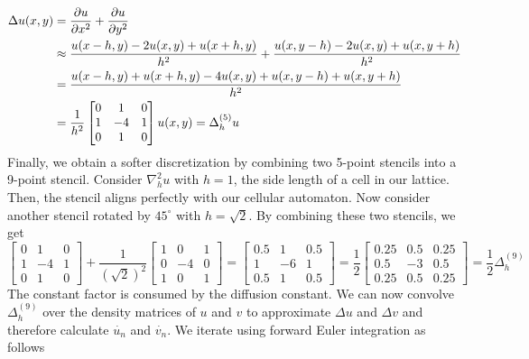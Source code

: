 \begin{align*}
  \Delta u(x, y) &= \pdv{u}{x^2} + \pdv{u}{y^2}\\
                     &\approx \frac{u(x-h, y) -2u(x, y) + u(x+h, y)}{h^2} + \frac{u(x, y-h) -2u(x, y) + u(x, y+h)}{h^2}\\
                     &= \frac{u(x-h, y)+ u(x+h, y) -4u(x, y) + u(x, y-h) + u(x, y+h)}{h^2}\\
                     &= \frac{1}{h^2} \begin{bmatrix}
                                0 & 1 & 0\\
                                1 & -4 & 1\\
                                0 & 1 & 0
                     \end{bmatrix} u(x, y) = \Delta^{(5)}_h u
\end{align*}
Finally, we obtain a softer discretization by combining two 5-point stencils into a 9-point stencil. Consider $\nabla^2_h u$ with $h = 1$, the side length of a cell in our lattice. Then, the stencil aligns perfectly with our cellular automaton. Now consider another stencil rotated by $45^\circ$ with $h=\sqrt{2}$. By combining these two stencils, we get
\[
  \begin{bmatrix}
    0 & 1 & 0\\
    1 & -4 & 1\\
    0 & 1 & 0
  \end{bmatrix}
  + \frac{1}{(\sqrt{2})^2}
  \begin{bmatrix}
    1 & 0 & 1\\
    0 & -4 & 0\\
    1 & 0 & 1
  \end{bmatrix}
  = 
  \begin{bmatrix}
    0.5 & 1 & 0.5\\
    1 & -6 & 1\\
    0.5 & 1 & 0.5
  \end{bmatrix}
  = \frac{1}{2}
  \begin{bmatrix}
    0.25 & 0.5 & 0.25\\
    0.5 & -3 & 0.5\\
    0.25 & 0.5 & 0.25
  \end{bmatrix}
  = \frac{1}{2} \Delta^{(9)}_h 
\]
The constant factor is consumed by the diffusion constant. We can now convolve $\Delta^{(9)}_h$ over the density matrices of $u$ and $v$ to approximate $\Delta u$ and $\Delta v$ and therefore calculate $\dot{u_n}$ and $\dot{v_n}$. We iterate using forward Euler integration as follows
